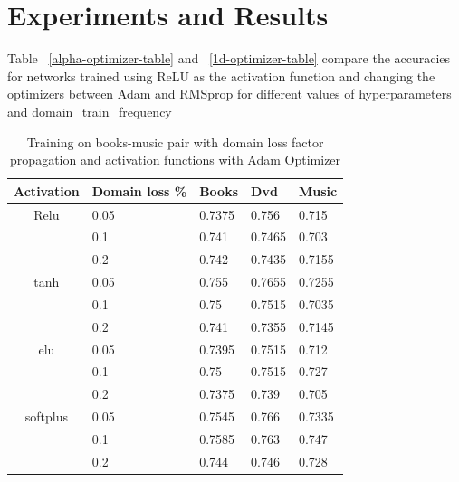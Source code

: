\documentclass[11pt,a4paper]{article}
\begin{document}
\section{Experiments and Results}
Table ~\ref{alpha-optimizer-table} and ~\ref{1d-optimizer-table} compare the accuracies for networks trained using ReLU as the activation function and changing the optimizers between Adam and RMSprop for different values of hyperparameters and domain\_train\_frequency

\begin{table}[h]
\begin{center}
\begin{tabular}{|c|l|l|l|l|}
\hline
Activation & \multicolumn{1}{|p{1cm}|}{Domain loss \%}& Books & Dvd & Music \\
\hline
Relu & 0.05 & 0.7375 & 0.756 & 0.715  \\
 & 0.1 & 0.741 & 0.7465 & 0.703 \\
 & 0.2 & 0.742 & 0.7435 & 0.7155 \\
\hline
tanh & 0.05 & 0.755 & 0.7655 & 0.7255 \\
 & 0.1 & 0.75 & 0.7515 & 0.7035 \\
 & 0.2 & 0.741 & 0.7355 & 0.7145 \\
\hline
elu & 0.05 & 0.7395 & 0.7515 & 0.712 \\
 & 0.1 & 0.75 & 0.7515 & 0.727 \\
 & 0.2 & 0.7375 & 0.739 & 0.705 \\
\hline
softplus & 0.05 & 0.7545 & 0.766 & 0.7335 \\
 & 0.1 & 0.7585 & 0.763 & 0.747 \\
 & 0.2 & 0.744 & 0.746 & 0.728 \\
\hline
\end{tabular}
\end{center}
\caption{ Training on books-music pair with domain loss factor propagation and activation functions with Adam Optimizer}
\label{alpha-activation-table}
\end{table}
\end{document}
